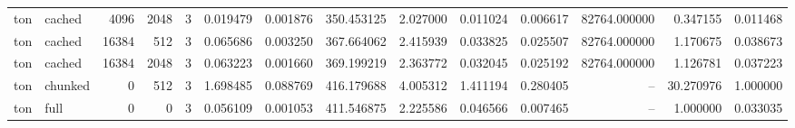 \begin{tabular}{llrrrrrrrrrrrr}
ton & cached & 4096 & 2048 & 3 & 0.019479 & 0.001876 & 350.453125 & 2.027000 & 0.011024 & 0.006617 & 82764.000000 & 0.347155 & 0.011468 \\
ton & cached & 16384 & 512 & 3 & 0.065686 & 0.003250 & 367.664062 & 2.415939 & 0.033825 & 0.025507 & 82764.000000 & 1.170675 & 0.038673 \\
ton & cached & 16384 & 2048 & 3 & 0.063223 & 0.001660 & 369.199219 & 2.363772 & 0.032045 & 0.025192 & 82764.000000 & 1.126781 & 0.037223 \\
ton & chunked & 0 & 512 & 3 & 1.698485 & 0.088769 & 416.179688 & 4.005312 & 1.411194 & 0.280405 & -- & 30.270976 & 1.000000 \\
ton & full & 0 & 0 & 3 & 0.056109 & 0.001053 & 411.546875 & 2.225586 & 0.046566 & 0.007465 & -- & 1.000000 & 0.033035 \\
\bottomrule
\end{tabular}
